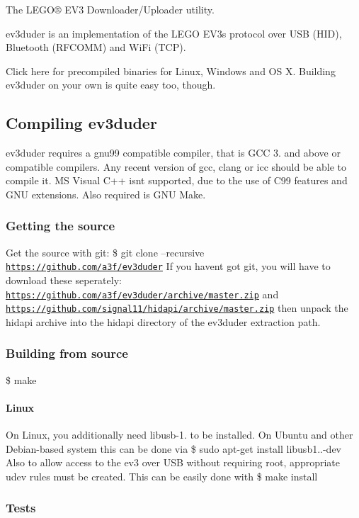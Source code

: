 The L\+E\+G\+O® E\+V3 Downloader/\+Uploader utility.

ev3duder is an implementation of the L\+E\+G\+O E\+V3\textquotesingle{}s protocol over U\+S\+B (H\+I\+D), Bluetooth (R\+F\+C\+O\+M\+M) and Wi\+Fi (T\+C\+P).

Click here for precompiled binaries for Linux, Windows and O\+S X. Building ev3duder on your own is quite easy too, though. \subsection*{Compiling ev3duder}

ev3duder requires a gnu99 compatible compiler, that is G\+C\+C 3. and above or compatible compilers. Any recent version of gcc, clang or icc should be able to compile it. M\+S Visual C++ isn\textquotesingle{}t supported, due to the use of C99 features and G\+N\+U extensions. Also required is G\+N\+U Make.

\subsubsection*{Getting the source}

Get the source with git\+: \$ git clone --recursive \href{https://github.com/a3f/ev3duder}{\tt https\+://github.\+com/a3f/ev3duder} If you haven\textquotesingle{}t got git, you will have to download these seperately\+: \href{https://github.com/a3f/ev3duder/archive/master.zip}{\tt https\+://github.\+com/a3f/ev3duder/archive/master.\+zip} and \href{https://github.com/signal11/hidapi/archive/master.zip}{\tt https\+://github.\+com/signal11/hidapi/archive/master.\+zip} then unpack the hidapi archive into the hidapi directory of the ev3duder extraction path.

\subsubsection*{Building from source}

\$ make \paragraph*{Linux}

On Linux, you additionally need libusb-\/1. to be installed. On Ubuntu and other Debian-\/based system this can be done via \$ sudo apt-\/get install libusb1..-\/dev Also to allow access to the ev3 over U\+S\+B without requiring root, appropriate udev rules must be created. This can be easily done with \$ make install \subsubsection*{Tests}

